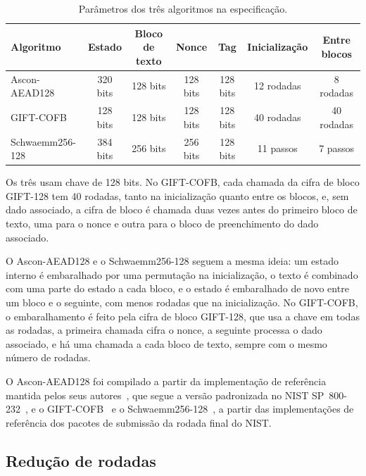 \begin{table}[htb]
\centering
\caption{Parâmetros dos três algoritmos na especificação.}
\label{tab:met-algoritmos}
\footnotesize
\setlength{\tabcolsep}{4pt}
\begin{tabular}{lcccccc}
\toprule
Algoritmo & Estado & Bloco de texto & Nonce & Tag & Inicialização & Entre blocos \\
\midrule
Ascon-AEAD128   & 320 bits & 128 bits & 128 bits & 128 bits & 12 rodadas & 8 rodadas \\
GIFT-COFB       & 128 bits & 128 bits & 128 bits & 128 bits & 40 rodadas & 40 rodadas \\
Schwaemm256-128 & 384 bits & 256 bits & 256 bits & 128 bits & 11 passos & 7 passos \\
\bottomrule
\end{tabular}
\par\smallskip\footnotesize Os três usam chave de 128 bits. No GIFT-COFB, cada chamada da cifra de bloco GIFT-128 tem 40 rodadas, tanto na inicialização quanto entre os blocos, e, sem dado associado, a cifra de bloco é chamada duas vezes antes do primeiro bloco de texto, uma para o nonce e outra para o bloco de preenchimento do dado associado.
\end{table}

O Ascon-AEAD128 e o Schwaemm256-128 seguem a mesma ideia: um estado interno é embaralhado por uma permutação na inicialização, o texto é combinado com uma parte do estado a cada bloco, e o estado é embaralhado de novo entre um bloco e o seguinte, com menos rodadas que na inicialização. No GIFT-COFB, o embaralhamento é feito pela cifra de bloco GIFT-128, que usa a chave em todas as rodadas, a primeira chamada cifra o nonce, a seguinte processa o dado associado, e há uma chamada a cada bloco de texto, sempre com o mesmo número de rodadas.

O Ascon-AEAD128 foi compilado a partir da implementação de referência mantida pelos seus autores~\cite{AsconC2024}, que segue a versão padronizada no NIST SP~800-232~\cite{nist_sp800232_2025}, e o GIFT-COFB~\cite{Banik2021} e o Schwaemm256-128~\cite{Beierle2021SparkleSub}, a partir das implementações de referência dos pacotes de submissão da rodada final do NIST.

\subsection{Redução de rodadas}
\label{sec:met-reducao}

